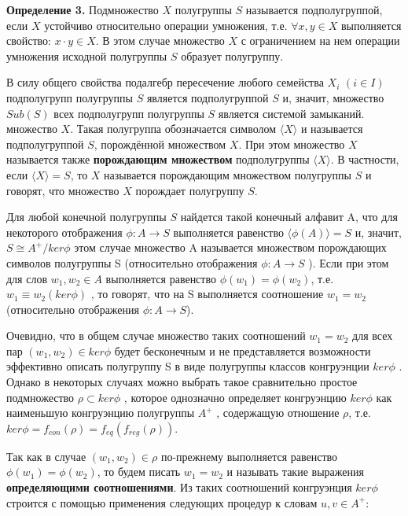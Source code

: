 \documentclass[bachelor, och, labwork]{shiza}
\begin{document}
    \textbf{Определение 3.} Подмножество $X$ полугруппы $S$ называется подполугруппой, если $X$ устойчиво относительно
    операции умножения, т.е. $\forall x, y \in X$ выполняется свойство: $x \cdot y \in X$. В этом случае множество $X$ с
    ограничением на нем операции умножения исходной полугруппы $S$ образует полугруппу.

    В силу общего свойства подалгебр пересечение любого семейства $X_i$ $(i \in I)$ подполугрупп полугруппы $S$ является
    подполугруппой $S$ и, значит, множество $Sub(S)$ всех подполугрупп полугруппы $S$ является системой замыканий.
    множество $X$. Такая полугруппа обозначается символом $\langle X \rangle$ и называется подполугруппой $S$,
    порождённой множеством $X$. При этом множество $X$ называется также \textbf{порождающим множеством} подполугруппы
    $\langle X \rangle$. В частности, если $\langle X \rangle = S$, то $X$ называется порождающим множеством полугруппы
    $S$ и говорят, что множество $X$ порождает полугруппу $S$.

    Для любой конечной полугруппы $S$ найдется такой конечный алфавит A, что для некоторого отображения $\phi : A
    \rightarrow S$ выполняется равенство $\langle \phi(A) \rangle =S$ и, значит, $S \cong A^+/ ker \phi$ этом случае
    множество A называется множеством порождающих символов полугруппы S (относительно отображения $\phi : A \rightarrow
    S$ ). Если при этом для слов $w_1,w_2 \in A$ выполняется равенство $\phi(w_1) = \phi(w_2)$, т.е. $w_1 \equiv
    w_2(ker\phi)$ , то говорят, что на S выполняется соотношение $w_1 = w_2$ (относительно отображения $\phi : A
    \rightarrow S$).

    Очевидно, что в общем случае множество таких соотношений $w_1 = w_2$ для всех пар $(w_1, w_2) \in ker\phi$ будет
    бесконечным и не представляется возможности эффективно описать полугруппу S в виде полугруппы классов конгруэнции
    $ker\phi$ . Однако в некоторых случаях можно выбрать такое сравнительно простое подмножество $\rho \subset ker\phi$
    , которое однозначно определяет конгруэнцию $ker\phi$ как наименьшую конгруэнцию полугруппы $A^+$ , содержащую
    отношение $\rho$, т.е. $ker\phi = f_{con}(\rho) = f_{eq}(f_{reg}(\rho))$.

    Так как в случае $(w_1, w_2) \in \rho$ по-прежнему выполняется равенство $\phi(w_1) = \phi(w_2)$, то будем писать
    $w_1 = w_2$ и называть такие выражения \textbf{определяющими соотношениями}. Из таких соотношений конгруэнция
    $ker\phi$ строится с помощью применения следующих процедур к словам $u,v \in A^+$:
\end{document}
